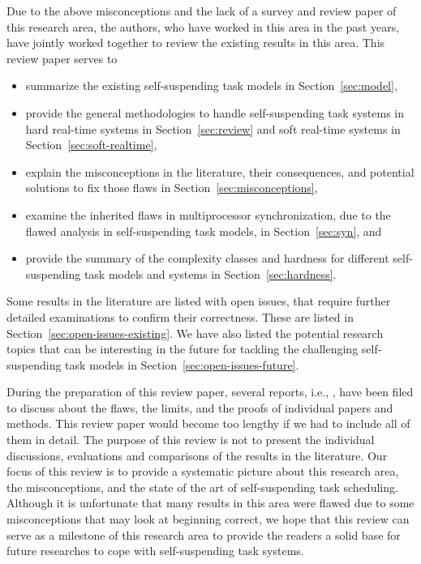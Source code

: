 \noindent Due to the above misconceptions and the lack of a survey and review paper of this research area, the authors, who have worked in this area in the past years, have jointly worked together to review the existing results in this area. This review paper serves to
\begin{itemize}
\item summarize the existing self-suspending task models in Section~\ref{sec:model}, 
\item provide the general methodologies to handle self-suspending task systems in hard real-time systems in Section~\ref{sec:review} and soft real-time systems in Section~\ref{sec:soft-realtime}, 
\item explain the misconceptions in the literature, their consequences, and potential solutions to fix those flaws in Section~\ref{sec:misconceptions}, 
\item examine the inherited flaws in multiprocessor synchronization, due to the flawed analysis in self-suspending task models, in Section~\ref{sec:syn}, and
\item provide the summary of the complexity classes and hardness for different self-suspending task models and systems in Section~\ref{sec:hardness}.
\end{itemize}
Some results in the literature are listed with open issues, that require further detailed examinations to confirm their correctness. These are listed in Section~\ref{sec:open-issues-existing}. We have also listed the potential research topics that can be interesting in the future for tackling the challenging self-suspending task models in Section~\ref{sec:open-issues-future}.

During the preparation of this review paper, several reports, i.e., \cite{ChenHuangNelissen,ChenBrandenburg,erratu-cong-anderson,BletsasReport2015}, have been filed to discuss about the flaws, the limits, and the proofs of individual papers and methods. This review paper would become too lengthy if we had to include all of them in detail.  The purpose of this review is not to present the individual discussions, evaluations and comparisons of the results in the literature. Our focus of this review is to provide a systematic picture about this research area, the misconceptions, and the state of the art of self-suspending task scheduling. Although it is unfortunate that many results in this area were flawed due to some misconceptions that may look at beginning correct, we hope that this review can serve as a milestone of this research area to provide the readers a solid base for future researches to cope with self-suspending task systems.





    
  

    
  